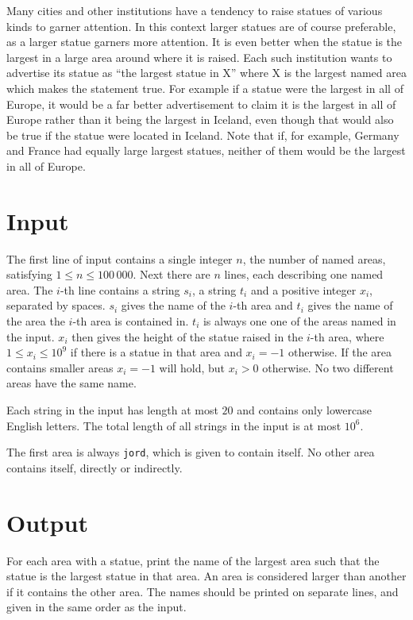 
Many cities and other institutions have a tendency to raise
statues of various kinds to garner attention.
In this context larger statues are of course preferable,
as a larger statue garners more attention.
It is even better when the statue is the largest in a large
area around where it is raised.
Each such institution wants to advertise its statue as
``the largest statue in X'' where X is the largest named
area which makes the statement true.
For example if a statue were the largest in all of Europe,
it would be a far better advertisement to claim it is the
largest in all of Europe rather than it being the largest
in Iceland, even though that would also be true if the
statue were located in Iceland.
Note that if, for example, Germany and France had equally
large largest statues, neither of them would be the largest
in all of Europe.

\section*{Input}
The first line of input contains a single integer $n$, the
number of named areas, satisfying $1 \leq n \leq 100\,000$.
Next there are $n$ lines, each describing one named area.
The $i$-th line contains a string $s_i$, a string $t_i$ and
a positive integer $x_i$, separated by spaces.
$s_i$ gives the name of the $i$-th area and $t_i$ gives the 
name of the area the $i$-th area is contained in.
$t_i$ is always one one of the areas named in the input.
$x_i$ then gives the height of the statue raised in the $i$-th area,
where $1 \leq x_i \leq 10^9$ if there is a statue in that area
and $x_i = -1$ otherwise.
If the area contains smaller areas $x_i = -1$ will hold, but
$x_i > 0$ otherwise.
No two different areas have the same name.

Each string in the input has length at most $20$ and
contains only lowercase English letters.
The total length of all strings in the input is at most
$10^6$.

The first area is always \texttt{jord}, which is given
to contain itself. 
No other area contains itself, directly or indirectly.

\section*{Output}
For each area with a statue, print the name of the largest
area such that the statue is the largest statue in that area.
An area is considered larger than another if it contains
the other area.
The names should be printed on separate lines, and given
in the same order as the input.
